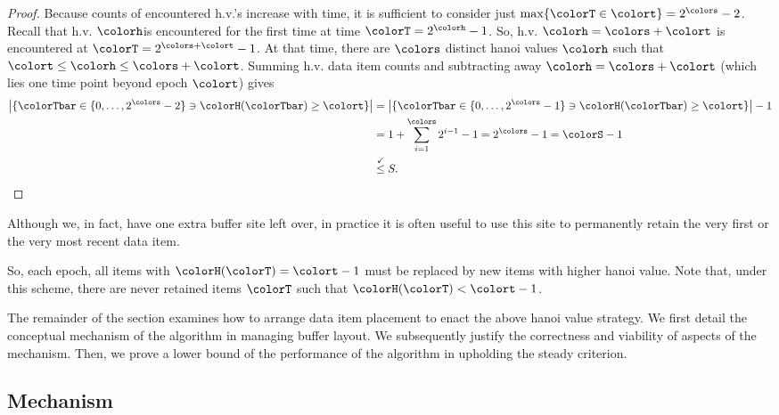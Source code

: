 \begin{proof}
Because counts of encountered h.v.'s increase with time, it is sufficient to consider just $\max\{\colorT \in \colort\} = 2^{\colors} - 2$.
Recall that h.v. $\colorh $is encountered for the first time at time $\colorT = 2^{\colorh} - 1$.
So, h.v. $\colorh = \colors + \colort$ is encountered at $\colorT = 2^{\colors + \colort} - 1$.
At that time, there are $\colors$ distinct hanoi values $\colorh$ such that $\colort \leq \colorh \leq \colors + \colort$.
Summing h.v. data item counts and subtracting away $\colorh = \colors + \colort$ (which lies one time point beyond epoch $\colort$) gives
\begin{align*}
\left| \{\colorTbar \in \{0, \ldots, 2^{\colors} - 2 \} \ni \colorH(\colorTbar) \geq \colort \} \right|
&= \left| \{\colorTbar \in \{0, \ldots, 2^{\colors} - 1 \} \ni \colorH(\colorTbar) \geq \colort \} \right| - 1\\
&= 1 + \sum_{i=1}^{\colors} 2^{i - 1} - 1 = 2^{\colors} - 1 = \colorS - 1\\
&\stackrel{\checkmark}{\leq} S.
\end{align*}
\end{proof}

Although we, in fact, have one extra buffer site left over, in practice it is often useful to use this site to permanently retain the very first or the very most recent data item.





So, each epoch, all items with $\colorH(\colorT) = \colort - 1$ must be replaced by new items with higher hanoi value.
Note that, under this scheme, there are never retained items $\colorT$ such that $\colorH(\colorT) < \colort - 1$.

The remainder of the section examines how to arrange data item placement to enact the above hanoi value strategy.
We first detail the conceptual mechanism of the algorithm in managing buffer layout.
We subsequently justify the correctness and viability of aspects of the mechanism.
Then, we prove a lower bound of the performance of the algorithm in upholding the steady criterion.

\subsection{Mechanism}


